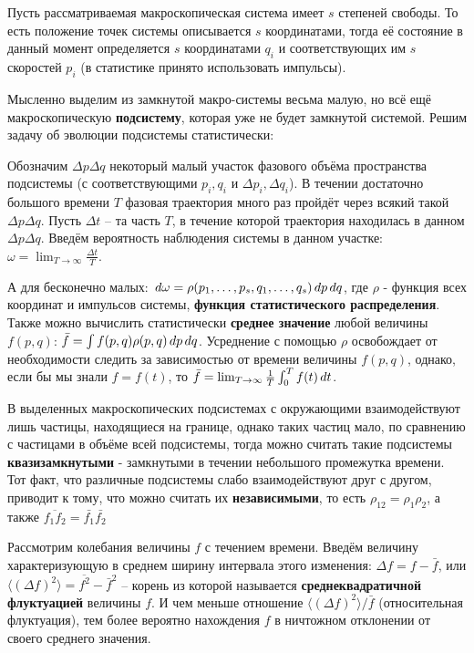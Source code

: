 
\section{}

Пусть рассматриваемая макроскопическая система имеет $s$ степеней свободы. То есть положение точек системы описывается $s$ координатами, тогда её состояние в данный момент определяется $s$ координатами $q_i$ и соответствующих им $s$ скоростей $p_i$ (в статистике принято использовать импульсы).

Мысленно выделим из замкнутой макро-системы весьма малую, но всё ещё макроскопическую \textbf{подсистему}, которая уже не будет замкнутой системой. Решим задачу об эволюции подсистемы статистически:

Обозначим $\Delta p \Delta q$ некоторый малый участок фазового объёма пространства подсистемы (с соответствующими $p_i, q_i$ и $\Delta p_i, \Delta q_i$). В течении достаточно большого времени $T$ фазовая траектория много раз пройдёт через всякий такой $\Delta p \Delta q$. 
Пусть $\Delta t$ -- та часть $T$, в течение которой траектория находилась в данном $\Delta p \Delta q$. Введём вероятность наблюдения системы в данном участке: $\omega = \lim_{T \rightarrow \infty} \frac{\Delta t}{T}$. 

А для бесконечно малых:	$\, d \omega = \rho(p_1,\ldots,p_s,q_1,\ldots,q_s) \, d p \, d q$, где $\rho$ - функция всех координат и импульсов системы, \textbf{функция статистического распределения}. Также можно вычислить статистически \textbf{среднее значение} любой величины $f(p,q)$: $\bar{f} = \int f(p,q) \rho (p,q) \, d p \, d q$. 
Усреднение с помощью $\rho$ освобождает от необходимости следить за зависимостью от времени величины $f(p,q)$, однако, если бы мы знали $f = f(t)$, то $\bar{f} = \lim_{T \rightarrow \infty} \frac{1}{T} \int_0^T f(t) \, d t$.

В выделенных макроскопических подсистемах с окружающими взаимодействуют лишь частицы, находящиеся на границе, однако таких частиц мало, по сравнению с частицами в объёме всей подсистемы, тогда можно считать такие подсистемы \textbf{квазизамкнутыми} - замкнутыми в течении небольшого промежутка времени. Тот факт, что различные подсистемы слабо взаимодействуют друг с другом, приводит к тому, что можно считать их \textbf{независимыми}, то есть $\rho_{1 2}= \rho_1 \rho_2$, а также $\overline{f_1 f_2} = \bar{f_1}\bar{f_2}$

Рассмотрим колебания величины $f$ с течением времени. Введём величину характеризующую в среднем ширину интервала этого изменения: $\Delta f = f - \bar{f}$, или $\langle (\Delta f)^2\rangle = \overline{f^2} - \bar{f}^2$ -- корень из которой называется \textbf{среднеквадратичной флуктуацией} величины $f$. И чем меньше отношение $\langle (\Delta f)^2\rangle/\bar{f}$ (относительная флуктуация), тем более вероятно нахождения $f$ в ничтожном отклонении от своего среднего значения.


